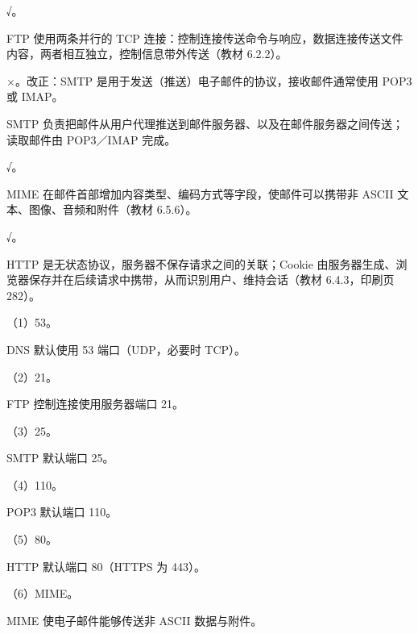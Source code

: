 \documentclass[a4paper,11pt]{article}
\begin{document}
\q √。\begin{analysis}FTP 使用两条并行的 TCP 连接：控制连接传送命令与响应，数据连接传送文件内容，两者相互独立，控制信息带外传送（教材 6.2.2）。\end{analysis}

\q ×。改正：SMTP 是用于发送（推送）电子邮件的协议，接收邮件通常使用 POP3 或 IMAP。\begin{analysis}SMTP 负责把邮件从用户代理推送到邮件服务器、以及在邮件服务器之间传送；读取邮件由 POP3／IMAP 完成。\end{analysis}

\q √。\begin{analysis}MIME 在邮件首部增加内容类型、编码方式等字段，使邮件可以携带非 ASCII 文本、图像、音频和附件（教材 6.5.6）。\end{analysis}

\q √。\begin{analysis}HTTP 是无状态协议，服务器不保存请求之间的关联；Cookie 由服务器生成、浏览器保存并在后续请求中携带，从而识别用户、维持会话（教材 6.4.3，印刷页 282）。\end{analysis}


\q （1）53。\begin{analysis}DNS 默认使用 53 端口（UDP，必要时 TCP）。\end{analysis}

\q （2）21。\begin{analysis}FTP 控制连接使用服务器端口 21。\end{analysis}

\q （3）25。\begin{analysis}SMTP 默认端口 25。\end{analysis}

\q （4）110。\begin{analysis}POP3 默认端口 110。\end{analysis}

\q （5）80。\begin{analysis}HTTP 默认端口 80（HTTPS 为 443）。\end{analysis}

\q （6）MIME。\begin{analysis}MIME 使电子邮件能够传送非 ASCII 数据与附件。\end{analysis}

\end{document}
